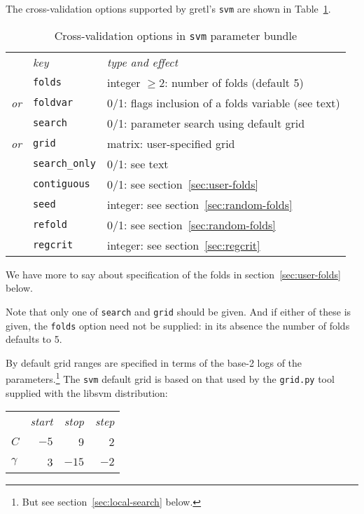 \documentclass{article}
\begin{document}
The cross-validation options supported by gretl's \texttt{svm} are
shown in Table~\ref{tab:xvalid}.

\begin{table}[htbp]
  \centering
  \begin{tabular}{lll}
  & \textit{key} & \textit{type and effect} \\[4pt]
   & \texttt{folds} & integer $\geq 2$: number of folds (default 5) \\
  \textit{or} & \texttt{foldvar} & 0/1: flags inclusion of a folds variable
    (see text) \\[4pt]
   & \texttt{search} & 0/1: parameter search using default grid \\
 \textit{or} & \texttt{grid} & matrix: user-specified grid \\[4pt]
    & \texttt{search\_only} & 0/1: see text \\
    & \texttt{contiguous} & 0/1: see section~\ref{sec:user-folds} \\
    & \texttt{seed} & integer: see section~\ref{sec:random-folds} \\
    & \texttt{refold} & 0/1: see section~\ref{sec:random-folds} \\
    & \texttt{regcrit} & integer: see section~\ref{sec:regcrit}
  \end{tabular}
  \caption{Cross-validation options in \texttt{svm} parameter bundle}
  \label{tab:xvalid}
\end{table}

We have more to say about specification of the folds in
section~\ref{sec:user-folds} below.

Note that only one of \texttt{search} and \texttt{grid} should be
given. And if either of these is given, the \texttt{folds} option
need not be supplied: in its absence the number of folds defaults to
5.

By default grid ranges are specified in terms of the base-2 logs of
the parameters.\footnote{But see section~\ref{sec:local-search}
  below.}  The \texttt{svm} default grid is based on that used by the
\texttt{grid.py} tool supplied with the \textsf{libsvm} distribution:
\begin{center}
\begin{tabular}{lrrr}
 & \textit{start} & \textit{stop} & \textit{step} \\[2pt]
$C$ & $-5$ & 9 & 2 \\
$\gamma$ & 3 & $-15$ & $-2$ 
\end{tabular}
\end{center}
\end{document}
